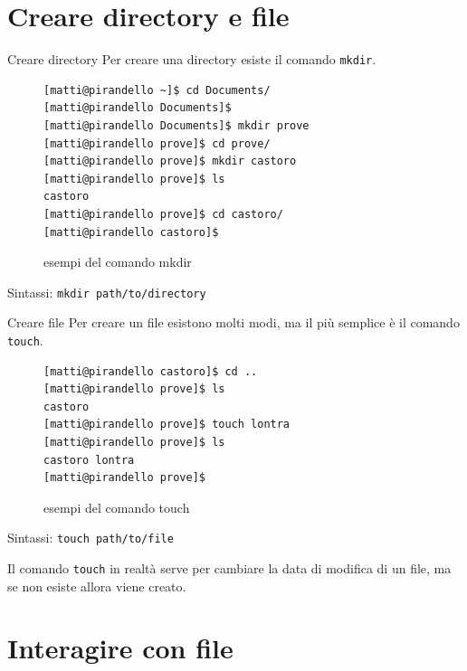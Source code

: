 \documentclass{beamer}
\begin{document}
\section{Creare directory e file}
\begin{frame}[fragile]{Creare directory}
  Per creare una directory esiste il comando \texttt{mkdir}.
  \begin{figure}
    \begin{lstlisting}[basicstyle=\small]
[matti@pirandello ~]$ cd Documents/
[matti@pirandello Documents]$ 
[matti@pirandello Documents]$ mkdir prove
[matti@pirandello prove]$ cd prove/
[matti@pirandello prove]$ mkdir castoro 
[matti@pirandello prove]$ ls 
castoro
[matti@pirandello prove]$ cd castoro/
[matti@pirandello castoro]$
    \end{lstlisting}
    \caption{esempi del comando mkdir}
  \end{figure}

  Sintassi: \texttt{mkdir path/to/directory}
\end{frame}

\begin{frame}[fragile]{Creare file}
  Per creare un file esistono molti modi, ma il più semplice è il comando 
  \texttt{touch}.
  \begin{figure}
    \begin{lstlisting}[basicstyle=\small]
[matti@pirandello castoro]$ cd ..
[matti@pirandello prove]$ ls 
castoro
[matti@pirandello prove]$ touch lontra 
[matti@pirandello prove]$ ls 
castoro lontra
[matti@pirandello prove]$
    \end{lstlisting}
    \caption{esempi del comando touch}
  \end{figure}

  Sintassi: \texttt{touch path/to/file} \bigskip

  \footnotesize
  Il comando \texttt{touch} in realtà serve per cambiare la data di modifica di 
  un file, ma se non esiste allora viene creato.\bigskip
\end{frame}

\section{Interagire con file}
\end{document}
